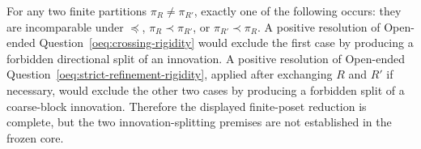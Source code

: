 For any two finite partitions \(\pi_R\neq\pi_{R'}\), exactly one of the following occurs: they are incomparable under \(\preceq\), \(\pi_R\prec\pi_{R'}\), or \(\pi_{R'}\prec\pi_R\). A positive resolution of Open-ended Question~\ref{oeq:crossing-rigidity} would exclude the first case by producing a forbidden directional split of an innovation. A positive resolution of Open-ended Question~\ref{oeq:strict-refinement-rigidity}, applied after exchanging \(R\) and \(R'\) if necessary, would exclude the other two cases by producing a forbidden split of a coarse-block innovation. Therefore the displayed finite-poset reduction is complete, but the two innovation-splitting premises are not established in the frozen core.